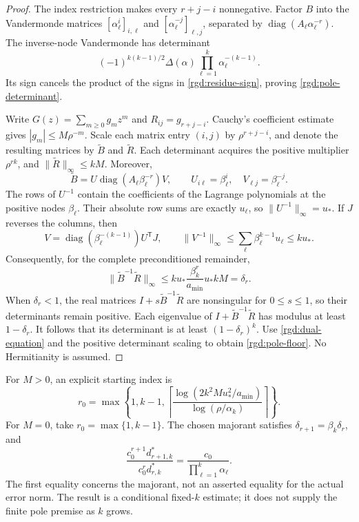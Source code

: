 \begin{proof}
The index restriction makes every $r+j-i$ nonnegative.  Factor $B$ into
the Vandermonde matrices $[\alpha_\ell^i]_{i,\ell}$ and
$[\alpha_\ell^{-j}]_{\ell,j}$, separated by
$\operatorname{diag}(A_\ell\alpha_\ell^{-r})$.
The inverse-node Vandermonde has determinant
\[
 (-1)^{k(k-1)/2}\Delta(\alpha)
       \prod_{\ell=1}^k\alpha_\ell^{-(k-1)}.
\]
Its sign cancels the product of the signs in
\eqref{rgd:residue-sign}, proving \eqref{rgd:pole-determinant}.

Write $G(z)=\sum_{m\ge0}g_mz^m$ and
$R_{ij}=g_{r+j-i}$.  Cauchy's coefficient estimate gives
$|g_m|\le M\rho^{-m}$.  Scale each matrix entry $(i,j)$ by
$\rho^{r+j-i}$, and denote the resulting matrices by
$\widetilde B$ and $\widetilde R$.  Each determinant acquires the
positive multiplier $\rho^{rk}$, and
$\|\widetilde R\|_\infty\le kM$.  Moreover,
\[
 \widetilde B
 =U\operatorname{diag}(A_\ell\beta_\ell^{-r})V,
 \qquad U_{i\ell}=\beta_\ell^i,\quad V_{\ell j}=\beta_\ell^{-j}.
\]
The rows of $U^{-1}$ contain the coefficients of the Lagrange
polynomials at the positive nodes $\beta_\ell$.  Their absolute row
sums are exactly $u_\ell$, so $\|U^{-1}\|_\infty=u_*$.
If $J$ reverses the columns, then
\[
 V=\operatorname{diag}(\beta_\ell^{-(k-1)})U^{\mathsf T}J,
 \qquad
 \|V^{-1}\|_\infty
 \le\sum_\ell\beta_\ell^{k-1}u_\ell\le ku_*.
\]
Consequently, for the complete preconditioned remainder,
\[
 \|\widetilde B^{-1}\widetilde R\|_\infty
 \le ku_*\frac{\beta_k^r}{a_{\min}}u_*kM=\delta_r.
\]
When $\delta_r<1$, the real matrices
$I+s\widetilde B^{-1}\widetilde R$ are nonsingular for $0\le s\le1$,
so their determinants remain positive.  Each eigenvalue of
$I+\widetilde B^{-1}\widetilde R$ has modulus at least $1-\delta_r$.
It follows that its determinant is at least $(1-\delta_r)^k$.
Use \eqref{rgd:dual-equation} and the positive determinant scaling to
obtain \eqref{rgd:pole-floor}.  No Hermitianity is assumed.
\end{proof}

For $M>0$, an explicit starting index is
\begin{equation}
 r_0=\max\left\{1,k-1,
 \left\lceil\frac{\log(2k^2Mu_*^2/a_{\min})}
                        {\log(\rho/\alpha_k)}\right\rceil\right\}.
 \label{rgd:pole-start}
\end{equation}
For $M=0$, take $r_0=\max\{1,k-1\}$.  The chosen majorant satisfies
$\delta_{r+1}=\beta_k\delta_r$, and
\[
 \frac{c_0^{r+1}d^*_{r+1,k}}{c_0^rd^*_{r,k}}
   =\frac{c_0}{\prod_{\ell=1}^k\alpha_\ell}.
\]
The first equality concerns the majorant, not an asserted equality for
the actual error norm.  The result is a conditional fixed-$k$ estimate;
it does not supply the finite pole premise as $k$ grows.

